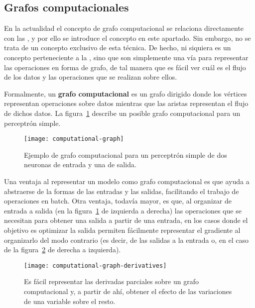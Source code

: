 \subsection{Grafos computacionales}

En la actualidad el concepto de grafo computacional se relaciona directamente con las , y por ello se introduce el concepto en este apartado. Sin embargo, no se trata de un concepto exclusivo de esta técnica. De hecho, ni siquiera es un concepto perteneciente a la , sino que son simplemente una vía para representar las operaciones en forma de grafo, de tal manera que es fácil ver cuál es el flujo de los datos y las operaciones que se realizan sobre ellos.

Formalmente, un \textbf{grafo computacional} es un grafo dirigido donde los vértices representan operaciones sobre datos mientras que las aristas representan el flujo de dichos datos. La figura~\ref{fig:computational-graph} describe un posible grafo computacional para un perceptrón simple.

\begin{figure}[t]
	\centering
	\texttt{[image: computational-graph]}
	\caption[Ejemplo de grafo computacional]{Ejemplo de grafo computacional para un perceptrón simple de dos neuronas de entrada y una de salida.}
	\label{fig:computational-graph}
\end{figure}

Una ventaja al representar un modelo como grafo computacional es que ayuda a abstraerse de la formas de las entradas y las salidas, facilitando el trabajo de operaciones en batch. Otra ventaja, todavía mayor, es que, al organizar de entrada a salida (en la figura~\ref{fig:computational-graph} de izquierda a derecha) las operaciones que se necesitan para obtener una salida a partir de una entrada, en los casos donde el objetivo es optimizar la salida permiten fácilmente representar el gradiente al organizarlo del modo contrario (es decir, de las salidas a la entrada o, en el caso de la figura~\ref{fig:computational-graph-derivatives} de derecha a izquierda).

\begin{figure}
	\centering
	\texttt{[image: computational-graph-derivatives]}
	\caption[Derivadas parciales sobre un grafo computacional]{Es fácil representar las derivadas parciales sobre un grafo computacional y, a partir de ahí, obtener el efecto de las variaciones de una variable sobre el resto.}
	\label{fig:computational-graph-derivatives}
\end{figure}

